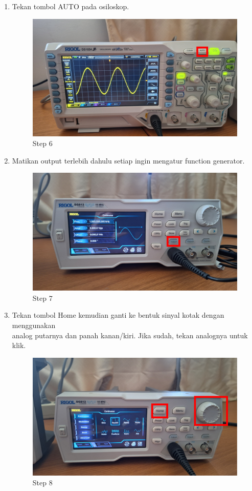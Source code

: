 \begin{center}
\begin{enumerate}
		\item Tekan tombol AUTO pada osiloskop.
		      \begin{figure}[H]
			      \centering
			      \includegraphics[width=0.8\linewidth]{P1/img/per 2/step 6.png}
			      \caption{Step 6}
			      \label{fig:Step 6(Group 12)}
		      \end{figure}

		\item Matikan output terlebih dahulu setiap ingin mengatur function generator.
		      \begin{figure}[H]
			      \centering
			      \includegraphics[width=0.8\linewidth]{P1/img/per 2/step 7.png}
			      \caption{Step 7}
			      \label{fig:Step 7(Group 16)}
		      \end{figure}

		\item Tekan tombol Home kemudian ganti ke bentuk sinyal kotak dengan menggunakan 
		\\analog putarnya dan panah kanan/kiri. Jika sudah, tekan analognya untuk klik.
		      \begin{figure}[H]
			      \centering
			      \includegraphics[width=0.7\linewidth]{P1/img/per 2/step 8.png}
			      \caption{Step 8}
			      \label{fig:Step 8(Group 13)}
		      \end{figure}


\end{enumerate}
\end{center}
